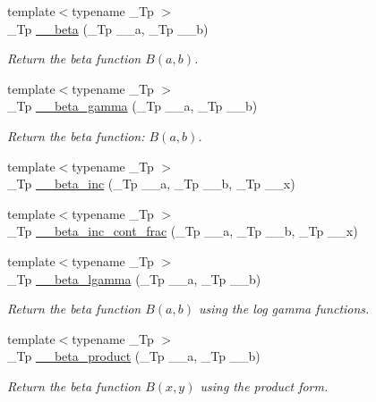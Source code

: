 \begin{DoxyCompactItemize}
{\footnotesize template$<$typename \+\_\+\+Tp $>$ }\\\+\_\+\+Tp \hyperlink{namespacestd_1_1____detail_a090d2f0920e0d208c467609b2a81d717}{\+\_\+\+\_\+beta} (\+\_\+\+Tp \+\_\+\+\_\+a, \+\_\+\+Tp \+\_\+\+\_\+b)
\begin{DoxyCompactList}\small\item\em Return the beta function $ B(a,b) $. \end{DoxyCompactList}\item 
{\footnotesize template$<$typename \+\_\+\+Tp $>$ }\\\+\_\+\+Tp \hyperlink{namespacestd_1_1____detail_a93cfa67cc3f14564925ed3153e055cd1}{\+\_\+\+\_\+beta\+\_\+gamma} (\+\_\+\+Tp \+\_\+\+\_\+a, \+\_\+\+Tp \+\_\+\+\_\+b)
\begin{DoxyCompactList}\small\item\em Return the beta function\+: $ B(a,b) $. \end{DoxyCompactList}\item 
{\footnotesize template$<$typename \+\_\+\+Tp $>$ }\\\+\_\+\+Tp \hyperlink{namespacestd_1_1____detail_aedfe43a9c0065cc3883df50536a625e4}{\+\_\+\+\_\+beta\+\_\+inc} (\+\_\+\+Tp \+\_\+\+\_\+a, \+\_\+\+Tp \+\_\+\+\_\+b, \+\_\+\+Tp \+\_\+\+\_\+x)
\item 
{\footnotesize template$<$typename \+\_\+\+Tp $>$ }\\\+\_\+\+Tp \hyperlink{namespacestd_1_1____detail_aed463a2b0bee0dcf6c9a63ed1dad7ed6}{\+\_\+\+\_\+beta\+\_\+inc\+\_\+cont\+\_\+frac} (\+\_\+\+Tp \+\_\+\+\_\+a, \+\_\+\+Tp \+\_\+\+\_\+b, \+\_\+\+Tp \+\_\+\+\_\+x)
\item 
{\footnotesize template$<$typename \+\_\+\+Tp $>$ }\\\+\_\+\+Tp \hyperlink{namespacestd_1_1____detail_ac4f233100713779d93e4eee7665bd0a5}{\+\_\+\+\_\+beta\+\_\+lgamma} (\+\_\+\+Tp \+\_\+\+\_\+a, \+\_\+\+Tp \+\_\+\+\_\+b)
\begin{DoxyCompactList}\small\item\em Return the beta function $B(a,b)$ using the log gamma functions. \end{DoxyCompactList}\item 
{\footnotesize template$<$typename \+\_\+\+Tp $>$ }\\\+\_\+\+Tp \hyperlink{namespacestd_1_1____detail_a9baa688a27befab7fa48ccfb4a87a9ca}{\+\_\+\+\_\+beta\+\_\+product} (\+\_\+\+Tp \+\_\+\+\_\+a, \+\_\+\+Tp \+\_\+\+\_\+b)
\begin{DoxyCompactList}\small\item\em Return the beta function $B(x,y)$ using the product form. \end{DoxyCompactList}\item 

\end{DoxyCompactItemize}
